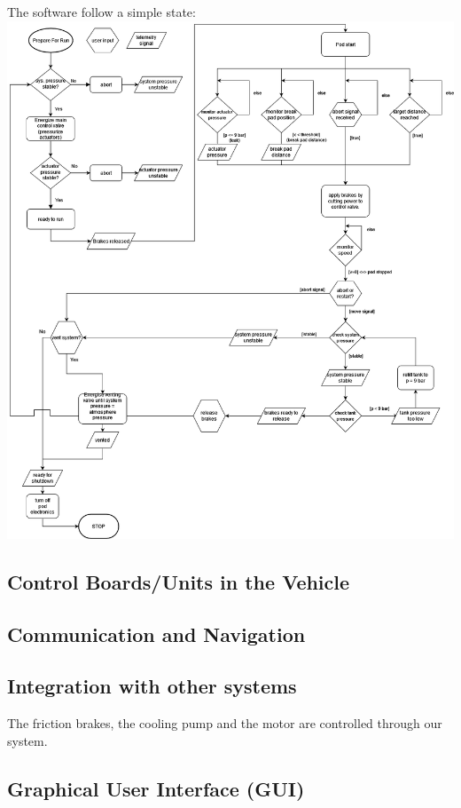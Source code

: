 The software follow a simple state: \\
\includegraphics[width=\textwidth]{texfiles/elec/eimg/brakesoftware_ext}


\subsection{Control Boards/Units in the Vehicle}

\subsection{Communication and Navigation}

\subsection{Integration with other systems}
The friction brakes, the cooling pump and the motor are controlled through our system.

\subsection{Graphical User Interface (GUI)}

